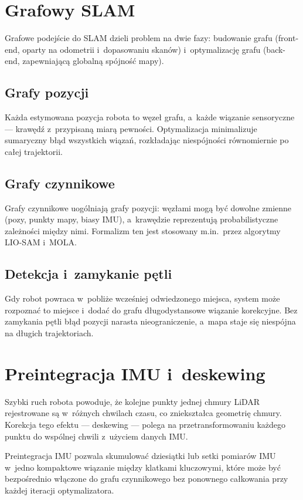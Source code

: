 \section{Grafowy SLAM}

Grafowe podejście do SLAM dzieli problem na dwie fazy: budowanie grafu
(front-end, oparty na odometrii i~dopasowaniu skanów) i~optymalizację grafu
(back-end, zapewniającą globalną spójność mapy).

\subsection{Grafy pozycji}

Każda estymowana pozycja robota to węzeł grafu, a~każde wiązanie sensoryczne ---
krawędź z~przypisaną miarą pewności.
Optymalizacja minimalizuje sumaryczny błąd wszystkich wiązań, rozkładając
niespójności równomiernie po całej trajektorii.

\subsection{Grafy czynnikowe}

Grafy czynnikowe uogólniają grafy pozycji: węzłami mogą być dowolne zmienne
(pozy, punkty mapy, biasy IMU), a~krawędzie reprezentują probabilistyczne
zależności między nimi.
Formalizm ten jest stosowany m.in.\ przez algorytmy LIO-SAM i~MOLA.

\subsection{Detekcja i~zamykanie pętli}

Gdy robot powraca w~pobliże wcześniej odwiedzonego miejsca, system może
rozpoznać to miejsce i~dodać do grafu długodystansowe wiązanie korekcyjne.
Bez zamykania pętli błąd pozycji narasta nieograniczenie, a~mapa staje się
niespójna na długich trajektoriach.

\section{Preintegracja IMU i~deskewing}

Szybki ruch robota powoduje, że kolejne punkty jednej chmury LiDAR rejestrowane
są w~różnych chwilach czasu, co zniekształca geometrię chmury.
Korekcja tego efektu --- deskewing --- polega na przetransformowaniu każdego
punktu do wspólnej chwili z~użyciem danych IMU.

Preintegracja IMU pozwala skumulować dziesiątki lub setki pomiarów IMU
w~jedno kompaktowe wiązanie między klatkami kluczowymi, które może być
bezpośrednio włączone do grafu czynnikowego bez ponownego całkowania
przy każdej iteracji optymalizatora.

